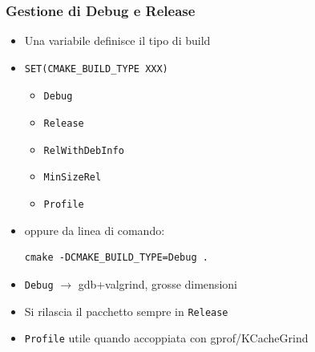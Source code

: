 \documentclass[10pt] {beamer}
\begin{document}
\begin{frame}[fragile]
\frametitle{Gestione di Debug e Release}
\begin{itemize}
\item Una variabile definisce il tipo di build
\item
\begin{verbatim}
SET(CMAKE_BUILD_TYPE XXX)
\end{verbatim}
    \begin{itemize}
    \item \texttt{Debug}
    \item \texttt{Release}
    \item \texttt{RelWithDebInfo}
    \item \texttt{MinSizeRel}
    \item \texttt{Profile}
    \end{itemize}
\item oppure da linea di comando:
\begin{verbatim}
cmake -DCMAKE_BUILD_TYPE=Debug .
\end{verbatim}

\item \texttt{Debug} $\rightarrow$ gdb+valgrind, grosse dimensioni
\item Si rilascia il pacchetto sempre in \texttt{Release}
\item \texttt{Profile} utile quando accoppiata con gprof/KCacheGrind
\end{itemize}
\end{frame}
\end{document}
